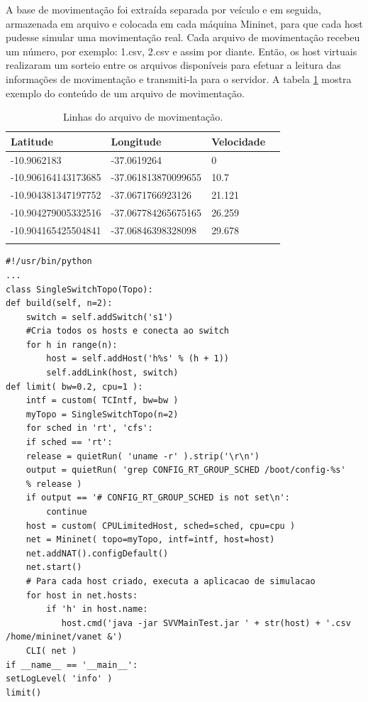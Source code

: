 \documentclass[
	12pt,				%
	oneside,			%
	a4paper,			%
	english,			%
	brazil				%
	]{abntex2ppgsi}
\begin{document}
A base de movimentação foi extraída separada por veículo e em seguida, armazenada em arquivo e colocada em cada máquina Mininet, para que cada host pudesse simular uma  movimentação real. Cada arquivo de movimentação recebeu um número, por exemplo: 1.csv, 2.csv e assim por diante. Então, os host virtuais realizaram um sorteio entre os arquivos disponíveis para efetuar a leitura das informações de movimentação e transmiti-la para o servidor. A tabela \ref{tab:linhasArquivoMovimentacao} mostra exemplo do conteúdo de um arquivo de movimentação.


\begin{longtable}{ p{}  p{}   p{}  p{}} 
	\hline
	\rowcolor[gray]{0.7}
	Latitude	& Longitude	& Velocidade \\ \hline
	-10.9062183	& -37.0619264& 0 \\ \hline
	-10.906164143173685 & -37.061813870099655 & 10.7	\\ \hline	
	-10.904381347197752 & -37.0671766923126 & 21.121 \\ \hline
	-10.904279005332516  & -37.067784265675165 & 26.259 \\ \hline
	-10.904165425504841 & -37.06846398328098 & 29.678 \\ \hline
	\caption{Linhas do arquivo de movimentação.} 
	\label{tab:linhasArquivoMovimentacao}
\end{longtable}
\newpage
\begin{lstlisting}[caption=Script Python para criação dos hosts no mininet., label=src:python]
#!/usr/bin/python
...
class SingleSwitchTopo(Topo):
def build(self, n=2):
    switch = self.addSwitch('s1')
    #Cria todos os hosts e conecta ao switch
    for h in range(n):	
		host = self.addHost('h%s' % (h + 1))
		self.addLink(host, switch)
def limit( bw=0.2, cpu=1 ):
	intf = custom( TCIntf, bw=bw )
	myTopo = SingleSwitchTopo(n=2)
	for sched in 'rt', 'cfs':
	if sched == 'rt':
	release = quietRun( 'uname -r' ).strip('\r\n')
	output = quietRun( 'grep CONFIG_RT_GROUP_SCHED /boot/config-%s'
	% release )
	if output == '# CONFIG_RT_GROUP_SCHED is not set\n':
		continue
	host = custom( CPULimitedHost, sched=sched, cpu=cpu )
	net = Mininet( topo=myTopo, intf=intf, host=host)
	net.addNAT().configDefault()
	net.start()
	# Para cada host criado, executa a aplicacao de simulacao
	for host in net.hosts:
		if 'h' in host.name:
		   host.cmd('java -jar SVVMainTest.jar ' + str(host) + '.csv /home/mininet/vanet &')
	CLI( net )
if __name__ == '__main__':
setLogLevel( 'info' )
limit()
\end{lstlisting}
\end{document}
